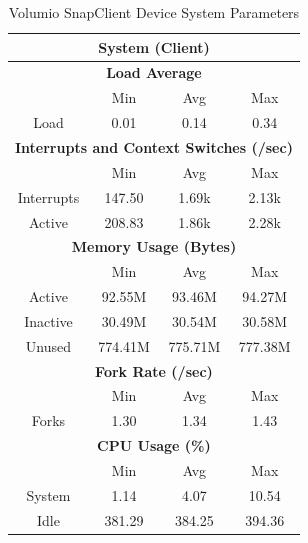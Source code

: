 \documentclass[11pt,a4paper]{scrreprt}
\begin{document}
\begin{table}[H]
\centering
    \begin{tabular}{||c|c|c|c|c|c|c||}
    \hline
    \multicolumn{7}{|c|}{\textbf{System (Client)}} \\
    \hline
    \multicolumn{7}{|c|}{\textbf{Load Average}} \\
    \hline\hline
      & \multicolumn{2}{|c|}{Min} & \multicolumn{2}{|c|}{Avg} & \multicolumn{2}{|c|}{Max} \\
    \hline
    Load & \multicolumn{2}{|c|}{0.01} & \multicolumn{2}{|c|}{0.14} & \multicolumn{2}{|c|}{0.34} \\
    \hline\hline
    \multicolumn{7}{|c|}{\textbf{Interrupts and Context Switches (/sec)}} \\
    \hline
      & \multicolumn{2}{|c|}{Min} & \multicolumn{2}{|c|}{Avg} & \multicolumn{2}{|c|}{Max} \\
    \hline
    Interrupts & \multicolumn{2}{|c|}{147.50} & \multicolumn{2}{|c|}{1.69k} & \multicolumn{2}{|c|}{2.13k} \\
    \hline
    Active & \multicolumn{2}{|c|}{208.83} & \multicolumn{2}{|c|}{1.86k} & \multicolumn{2}{|c|}{2.28k} \\
    \hline\hline
    \multicolumn{7}{|c|}{\textbf{Memory Usage (Bytes)}} \\
    \hline\hline
      & \multicolumn{2}{|c|}{Min} & \multicolumn{2}{|c|}{Avg} & \multicolumn{2}{|c|}{Max} \\
    \hline
    Active & \multicolumn{2}{|c|}{92.55M} & \multicolumn{2}{|c|}{93.46M} & \multicolumn{2}{|c|}{94.27M} \\
    \hline
    Inactive & \multicolumn{2}{|c|}{30.49M} & \multicolumn{2}{|c|}{30.54M} & \multicolumn{2}{|c|}{30.58M} \\
    \hline
    Unused & \multicolumn{2}{|c|}{774.41M} & \multicolumn{2}{|c|}{775.71M} & \multicolumn{2}{|c|}{777.38M} \\
    \hline\hline
    \multicolumn{7}{|c|}{\textbf{Fork Rate (/sec)}} \\
    \hline\hline
      & \multicolumn{2}{|c|}{Min} & \multicolumn{2}{|c|}{Avg} & \multicolumn{2}{|c|}{Max} \\
    \hline
    Forks & \multicolumn{2}{|c|}{1.30} & \multicolumn{2}{|c|}{1.34} & \multicolumn{2}{|c|}{1.43} \\
    \hline\hline
    \multicolumn{7}{|c|}{\textbf{CPU Usage (\%)}} \\
    \hline\hline
      & \multicolumn{2}{|c|}{Min} & \multicolumn{2}{|c|}{Avg} & \multicolumn{2}{|c|}{Max} \\
    \hline
    System & \multicolumn{2}{|c|}{1.14} & \multicolumn{2}{|c|}{4.07} & \multicolumn{2}{|c|}{10.54} \\
    \hline
    Idle & \multicolumn{2}{|c|}{381.29} & \multicolumn{2}{|c|}{384.25} & \multicolumn{2}{|c|}{394.36} \\
    \hline\hline
    \end{tabular}
    \caption{Volumio SnapClient Device System Parameters}
    \label{VolumioclientSysTab}
\end{table}
\end{document}
